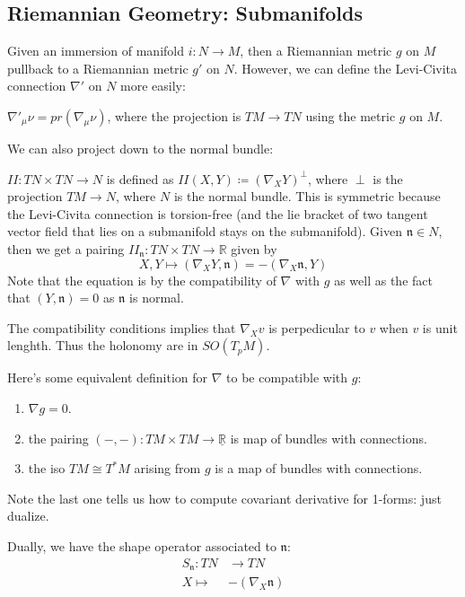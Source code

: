 \documentclass[main.tex]{subfiles}
\begin{document}
\subsection{Riemannian Geometry: Submanifolds}

Given an immersion of manifold $i: N \rightarrow M$, then a Riemannian metric $g$ on $M$ pullback to a Riemannian metric $g'$ on $N$. However, we can define the Levi-Civita connection
$\nabla'$ on $N$ more easily:
\begin{lemma}
$\nabla'_{\mu} \nu = pr (\nabla_{\mu} \nu)$, where the projection is $TM \rightarrow TN$ using the metric $g$ on $M$. 
\end{lemma}

We can also project down to the normal bundle:
\begin{definition}
$II: TN \times TN \rightarrow N$ is defined as $II(X, Y) \coloneqq (\nabla_{X} Y)^\perp$, where $\perp$ is the projection $TM \rightarrow N$, where $N$ is the normal bundle. This is symmetric because the Levi-Civita connection is torsion-free (and the lie bracket of two tangent vector field that lies on a submanifold stays on the submanifold).
Given $\mathfrak{n} \in N$, then we get a pairing $II_\mathfrak{n}: TN \times TN \rightarrow \mathbb{R}$ given by 
$$
X, Y \mapsto (\nabla_{X} Y, \mathfrak{n}) = - (\nabla_{X} \mathfrak{n}, Y)
$$
Note that the equation is by the compatibility of $\nabla$ with $g$ as well as the fact that $(Y, \mathfrak{n}) = 0$ as $\mathfrak{n}$ is normal.

The compatibility conditions implies that 
$\nabla_X v$ is perpedicular to $v$ when $v$ is unit lenghth. Thus the holonomy are in $SO(T_pM)$. 

Here's some equivalent definition for $\nabla$ to be compatible with $g$:
\begin{enumerate}
    \item $\nabla g = 0$.
    \item the pairing $(-,-): TM \times TM \rightarrow \underline{\mathbb{R}}$ is map of bundles with connections.
    \item the iso $TM \cong T^*M$ arising from $g$ is a map of bundles with connections.
\end{enumerate}

Note the last one tells us how to compute covariant derivative for 1-forms: just dualize.

Dually, we have the shape operator associated to $\mathfrak{n}$: 
\begin{align*}
S_{\mathfrak{n}}: TN &\rightarrow TN \\ 
X  \mapsto & - (\nabla_{X} \mathfrak{n}) 
\end{align*}
\end{definition}
\end{document}
